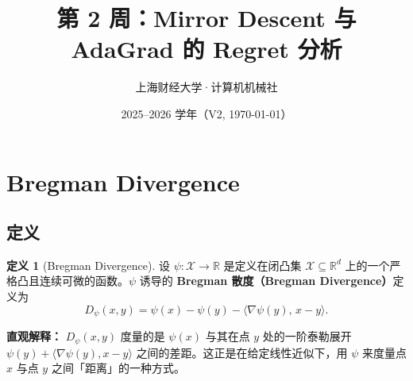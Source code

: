 \documentclass[12pt,a4paper]{ctexart}
\title{\textbf{第 2 周：Mirror Descent 与 AdaGrad 的 Regret 分析}}
\author{上海财经大学·计算机机械社}
\date{2025–2026 学年（V2, \today）}
\theoremstyle{definition}
\newtheorem{definition}{定义}[section]
\theoremstyle{plain}
\theoremstyle{remark}
\newcommand{\R}{\mathbb{R}}
\newcommand{\cX}{\mathcal{X}}
\begin{document}
\maketitle
\thispagestyle{fancy}

\begin{center}
\end{center}

\vspace{6pt}

\section{Bregman Divergence}

\subsection{定义}

\begin{definition}[Bregman Divergence]
设 $\psi : \cX \to \R$ 是定义在闭凸集 $\cX \subseteq \R^d$ 上的一个严格凸且连续可微的函数。$\psi$ 诱导的 \textbf{Bregman 散度（Bregman Divergence）}定义为
\begin{equation}\label{eq:bregman-def}
  D_\psi(x, y) = \psi(x) - \psi(y) - \langle \nabla\psi(y),\, x - y \rangle.
\end{equation}
\end{definition}

\textbf{直观解释：} $D_\psi(x, y)$ 度量的是 $\psi(x)$ 与其在点 $y$ 处的一阶泰勒展开 $\psi(y) + \langle\nabla\psi(y), x-y\rangle$ 之间的差距。这正是在给定线性近似下，用 $\psi$ 来度量点 $x$ 与点 $y$ 之间「距离」的一种方式。

\begin{figure}[htbp]
\centering
{}
\end{figure}
\end{document}
